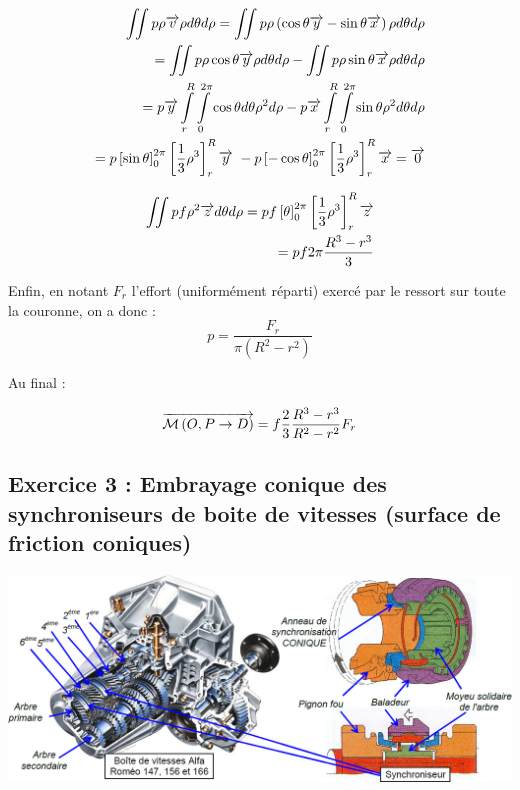 \documentclass[10pt,fleqn]{article} %
\begin{document}
\begin{multicols}{2}
\begin{corrige}
\begin{eqnarray*}
\iint p\rho\overrightarrow{v} \rho d\theta d\rho = \iint p\rho\left(\cos\theta\overrightarrow{y}-\sin\theta\overrightarrow{x} \right) \rho d\theta d\rho \\
=\iint p\rho\cos\theta\overrightarrow{y}  \rho d\theta d\rho-\iint p\rho \sin\theta\overrightarrow{x}  \rho d\theta d\rho \\
=p \overrightarrow{y}  \int\limits_{r}^{R} \int\limits_{0}^{2\pi}\cos\theta d\theta \rho^2 d\rho- p\overrightarrow{x}\int\limits_{r}^{R} \int\limits_{0}^{2\pi} \sin\theta  \rho^2 d\theta d\rho \\
=p \left[ \sin\theta\right]_{0}^{2\pi}\left[ \dfrac{1}{3}\rho^3\right]_{r}^{R}\overrightarrow{y}\
 -
p \left[ -\cos\theta\right]_{0}^{2\pi}\left[ \dfrac{1}{3}\rho^3\right]_{r}^{R}\overrightarrow{x} = \overrightarrow{0}
\end{eqnarray*}

\begin{eqnarray*}
\iint pf\rho^2 \overrightarrow{z} d\theta d\rho =
pf \left[ \theta\right]_{0}^{2\pi}\left[ \dfrac{1}{3}\rho^3\right]_{r}^{R} \overrightarrow{z}\\
= pf2\pi \dfrac{R^3-r^3}{3} 
\end{eqnarray*} 

Enfin, en notant $F_r$ l'effort (uniformément réparti) exercé par le ressort sur toute la couronne, on a donc :
$$
p=\dfrac{F_r}{\pi \left(R^2-r^2 \right)}
$$

Au final : 

$$ \overrightarrow{\mathcal{M}\left( {O}, {P} \rightarrow {D}\right)}  
= f\dfrac{2}{3} \dfrac{R^3-r^3}{R^2-r^2} F_r
$$
\end{corrige}

\else
\fi


\subsection*{Exercice 3 : Embrayage conique des synchroniseurs de boite de vitesses (surface de friction coniques)} 
\setcounter{exo}{0}
\begin{center}
\includegraphics[width=\linewidth]{images/fig_08}
\end{center}


\end{multicols}
\end{document}
